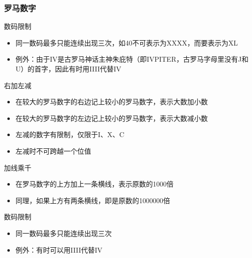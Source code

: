 \begin{frame}\frametitle{罗马数字}
	\begin{block}{数码限制}\pause
		\begin{itemize}[<+-| alert@+>]
			\item 同一数码最多只能连续出现三次，如40不可表示为XXXX，而要表示为XL
			\item 例外：由于IV是古罗马神话主神朱庇特（即IVPITER，古罗马字母里没有J和U）的首字，因此有时用IIII代替IV
		\end{itemize}
	\end{block}
\end{frame}

\begin{frame}
	\begin{block}{右加左减}
		\begin{itemize}
			\item 在较大的罗马数字的右边记上较小的罗马数字，表示大数加小数
			\item 在较大的罗马数字的左边记上较小的罗马数字，表示大数减小数
			\item 左减的数字有限制，仅限于I、X、C
			\item 左减时不可跨越一个位值
		\end{itemize}
	\end{block}
	\begin{exampleblock}{加线乘千}
		\begin{itemize}
			\item 在罗马数字的上方加上一条横线，表示原数的1000倍
			\item 同理，如果上方有两条横线，即是原数的1000000倍
		\end{itemize}
	\end{exampleblock}
	\begin{alertblock}{数码限制}
		\begin{itemize}
			\item 同一数码最多只能连续出现三次
			\item 例外：有时可以用IIII代替IV
		\end{itemize}
	\end{alertblock}
\end{frame}

